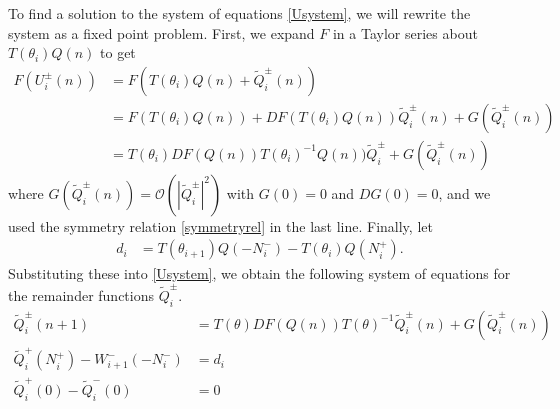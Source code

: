 \documentclass[12pt]{article}
\begin{document}
To find a solution to the system of equations \eqref{Usystem}, we will rewrite the system as a fixed point problem. First, we expand $F$ in a Taylor series about $T(\theta_i) Q(n)$ to get
\begin{align*}
F(U_i^\pm(n)) &= F(T(\theta_i) Q(n) + \tilde{Q}_i^\pm(n)) \\
&= F(T(\theta_i) Q(n)) + D F(T(\theta_i) Q(n)) \tilde{Q}_i^\pm(n) + G(\tilde{Q}_i^\pm(n)) \\
&= T(\theta_i)DF(Q(n))T(\theta_i)^{-1} Q(n)) \tilde{Q}_i^\pm + G(\tilde{Q}_i^\pm(n))
\end{align*}
where $G(\tilde{Q}_i^\pm(n)) = \mathcal{O}(|\tilde{Q}_i^\pm|^2)$ with $G(0) = 0$ and $DG(0) = 0$, and we used the symmetry relation \eqref{symmetryrel} in the last line. Finally, let
\begin{align} \label{didef}
d_i &= T(\theta_{i+1}) Q(-N_i^-) - T(\theta_i) Q(N_i^+).
\end{align}
Substituting these into \eqref{Usystem}, we obtain the following system of equations for the remainder functions $\tilde{Q}_i^\pm$.
\begin{align}
\tilde{Q}_i^\pm(n+1) &= T(\theta)D F(Q(n))T(\theta)^{-1} \tilde{Q}_i^\pm(n) + G(\tilde{Q}_i^\pm(n)) \label{Wsystem1} \\
\tilde{Q}_i^+(N_i^+) - W_{i+1}^-(-N_i^-) &= d_i \label{Wsystem2} \\
\tilde{Q}_i^+(0) - \tilde{Q}_i^-(0) &= 0 \label{Wsystem3}
\end{align}
\end{document}
